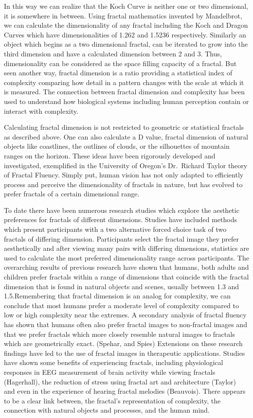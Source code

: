 \documentclass[english,jou]{apa6}
\begin{document}
In this way we can realize that the Koch Curve is neither one or two dimensional, it is somewhere in between. Using fractal mathematics invented by Mandelbrot, we can calculate the dimensionality of any fractal including the Koch and Dragon Curves which have dimensionalities of 1.262 and 1.5236 respectively. Similarly an object which begins as a two dimensional fractal, can be iterated to grow into the third dimension and have a calculated dimension between 2 and 3. Thus, dimensionality can be considered as the space filling capacity of a fractal. But seen another way, fractal dimension is a ratio providing a statistical index of complexity comparing how detail in a pattern changes with the scale at which it is measured. The connection between fractal dimension and complexity has been used to understand how biological systems including human perception contain or interact with complexity.

Calculating fractal dimension is not restricted to geometric or statistical fractals as described above. One can also calculate a D value, fractal dimension of natural objects like coastlines, the outlines of clouds, or the silhouettes of mountain ranges on the horizon. These ideas have been rigorously developed and investigated, exemplified in the University of Oregon's Dr.~Richard Taylor theory of Fractal Fluency. Simply put, human vision has not only adapted to efficiently process and perceive the dimensionality of fractals in nature, but has evolved to prefer fractals of a certain dimensional range.

To date there have been numerous research studies which explore the aesthetic preferences for fractals of different dimensions. Studies have included methods which present participants with a two alternative forced choice task of two fractals of differing dimension. Participants select the fractal image they prefer aesthetically and after viewing many pairs with differing dimensions, statistics are used to calculate the most preferred dimensionality range across participants. The overarching results of previous research have shown that humans, both adults and children prefer fractals within a range of dimensions that coincide with the fractal dimension that is found in natural objects and scenes, usually between 1.3 and 1.5.Remembering that fractal dimension is an analog for complexity, we can conclude that most humans prefer a moderate level of complexity compared to low or high complexity near the extremes. A secondary analysis of fractal fluency has shown that humans often also prefer fractal images to non-fractal images and that we prefer fractals which more closely resemble natural images to fractals which are geometrically exact. (Spehar, and Spies) Extensions on these research findings have led to the use of fractal images in therapeutic applications. Studies have shown some benefits of experiencing fractals, including physiological responses in EEG measurement of brain activity while viewing fractals (Hagerhall), the reduction of stress using fractal art and architecture (Taylor) and even in the experience of hearing fractal melodies (Beauvois). There appears to be a clear link between, the fractal's representation of complexity, the connection with natural objects and processes, and the human mind.
\end{document}
